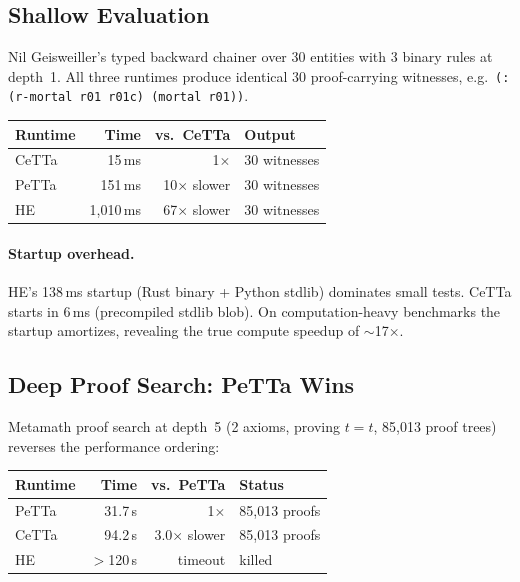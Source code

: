 \documentclass[11pt]{article}
\newcommand{\code}[1]{\texttt{#1}}
\newcommand{\PeTTa}{\textup{PeTTa}}
\newcommand{\HE}{\textup{HE}}
\newcommand{\CeTTa}{\textup{CeTTa}}
\begin{document}
\subsection{Shallow Evaluation}

Nil Geisweiller's typed backward chainer over 30 entities with 3 binary
rules at depth~1.  All three runtimes produce identical 30
proof-carrying witnesses, e.g.\
\code{(: (r-mortal r01 r01c) (mortal r01))}.

\begin{center}
\begin{tabular}{lrrl}
\toprule
Runtime & Time & vs.\ \CeTTa{} & Output \\
\midrule
\CeTTa{} & 15\,ms  & 1$\times$           & 30 witnesses \\
\PeTTa{} & 151\,ms & 10$\times$ slower    & 30 witnesses \\
\HE{}    & 1{,}010\,ms & 67$\times$ slower & 30 witnesses \\
\bottomrule
\end{tabular}
\end{center}

\paragraph{Startup overhead.}
\HE{}'s 138\,ms startup (Rust binary + Python stdlib) dominates small
tests.  \CeTTa{} starts in 6\,ms (precompiled stdlib blob).  On
computation-heavy benchmarks the startup amortizes, revealing the true
compute speedup of $\sim$17$\times$.

\subsection{Deep Proof Search: \PeTTa{} Wins}

Metamath proof search at depth~5 (2 axioms, proving $t = t$,
85{,}013 proof trees) reverses the performance ordering:

\begin{center}
\begin{tabular}{lrrl}
\toprule
Runtime & Time & vs.\ \PeTTa{} & Status \\
\midrule
\PeTTa{} & 31.7\,s  & 1$\times$          & 85{,}013 proofs \\
\CeTTa{} & 94.2\,s  & 3.0$\times$ slower & 85{,}013 proofs \\
\HE{}    & $>$120\,s & timeout            & killed \\
\bottomrule
\end{tabular}
\end{center}
\end{document}
